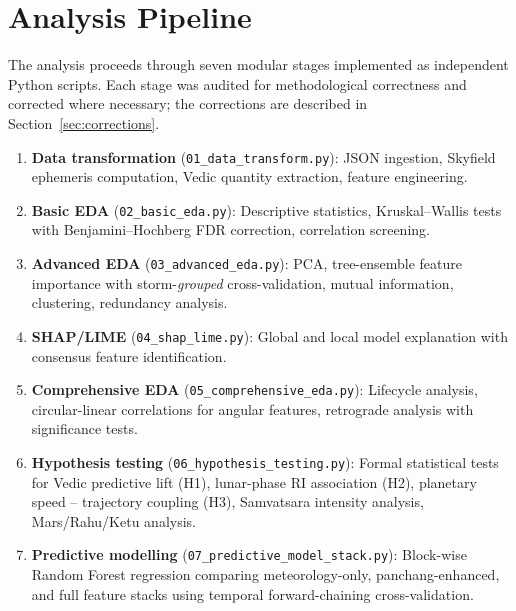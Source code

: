 \documentclass[12pt,a4paper]{article}
\begin{document}
\section{Analysis Pipeline}

The analysis proceeds through seven modular stages implemented as independent
Python scripts. Each stage was audited for methodological correctness and
corrected where necessary; the corrections are described in Section~\ref{sec:corrections}.

\begin{enumerate}
  \item \textbf{Data transformation} (\texttt{01\_data\_transform.py}): JSON ingestion,
        Skyfield ephemeris computation, Vedic quantity extraction, feature engineering.
  \item \textbf{Basic EDA} (\texttt{02\_basic\_eda.py}): Descriptive statistics,
        Kruskal--Wallis tests with Benjamini--Hochberg FDR correction,
        correlation screening.
  \item \textbf{Advanced EDA} (\texttt{03\_advanced\_eda.py}): PCA, tree-ensemble
        feature importance with storm-\emph{grouped} cross-validation, mutual
        information, clustering, redundancy analysis.
  \item \textbf{SHAP/LIME} (\texttt{04\_shap\_lime.py}): Global and local model
        explanation with consensus feature identification.
  \item \textbf{Comprehensive EDA} (\texttt{05\_comprehensive\_eda.py}): Lifecycle
        analysis, circular-linear correlations for angular features, retrograde
        analysis with significance tests.
  \item \textbf{Hypothesis testing} (\texttt{06\_hypothesis\_testing.py}): Formal
        statistical tests for Vedic predictive lift (H1), lunar-phase RI
        association (H2), planetary speed -- trajectory coupling (H3),
        Samvatsara intensity analysis, Mars/Rahu/Ketu analysis.
  \item \textbf{Predictive modelling} (\texttt{07\_predictive\_model\_stack.py}):
        Block-wise Random Forest regression comparing meteorology-only, panchang-enhanced,
        and full feature stacks using temporal forward-chaining cross-validation.
\end{enumerate}

\end{document}
